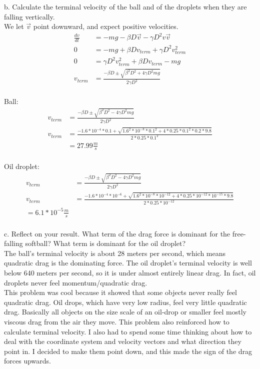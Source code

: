 \documentclass[10pt]{article} %
\begin{document}
b. Calculate the terminal velocity of the ball and of the droplets when they are falling vertically.\\

We let $\vec{v}$ point downward, and expect positive velocities.\\

\begin{align}
  \frac{dv}{dt} &= -mg −\beta D\vec{v} −\gamma D^2v\vec{v}\\
  0 &= -mg + \beta Dv_{term} +\gamma D^2v^2_{term}\\
  0 &= \gamma D^2v^2_{term} + \beta Dv_{term} - mg\\
  v_{term} &= \frac{-\beta D \pm \sqrt{\beta^2 D^2 + 4\gamma D^2mg}}{2\gamma D^2}\\
\end{align}

Ball:
\begin{align}
  v_{term} &= \frac{-\beta D \pm \sqrt{\beta^2 D^2 - 4\gamma D^2mg}}{2\gamma D^2}\\
  v_{term} &= \frac{-1.6*10^{-4}*0.1 + \sqrt{1.6^2*10^{-8}*0.1^2 + 4*0.25*0.1^2*0.2*9.8}}{2*0.25*0.1^2}\\
  &= 27.99 \frac{m}{s}\\
\end{align}

Oil droplet:
\begin{align}
  v_{term} &= \frac{-\beta D \pm \sqrt{\beta^2 D^2 - 4\gamma D^2mg}}{2\gamma D^2}\\
  v_{term} &= \frac{-1.6*10^{-4}*10^{-6} + \sqrt{1.6^2*10^{-8}*10^{-12} + 4*0.25*10^{-12}*10^{-15}*9.8}}{2*0.25*10^{-12}}\\
  = 6.1*10^{-5} \frac{m}{s}\\
\end{align}

c. Reflect on your result. What term of the drag force is dominant  for the  free-falling softball? What term is dominant for the oil droplet?\\

The ball's terminal velocity is about 28 meters per second, which means quadratic drag is the dominating force. The oil droplet's terminal velocity is well below 640 meters per second, so it is under almost entirely linear drag. In fact, oil droplets never feel momentum/quadratic drag.\\

This problem was cool because it showed that some objects never really feel quadratic drag. Oil drops, which have very low radius, feel very little quadratic drag. Basically all objects on the size scale of an oil-drop or smaller feel mostly viscous drag from the air they move. This problem also reinforced how to calculate terminal velocity. I also had to spend some time thinking about how to deal with the coordinate system and velocity vectors and what direction they point in. I decided to make them point down, and this made the sign of the drag forces upwards. \\
\end{document}

